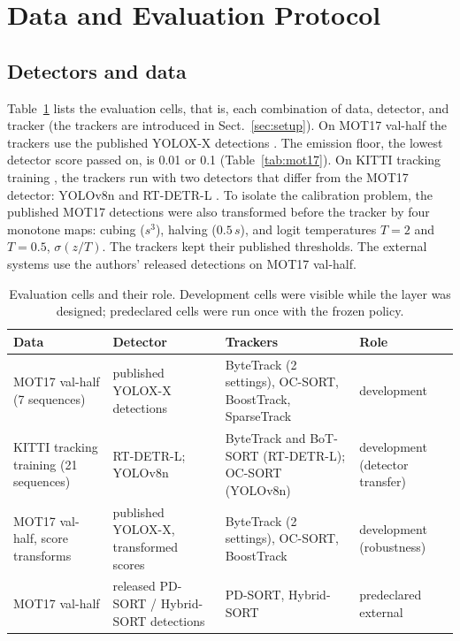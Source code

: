 \documentclass[pdflatex,sn-mathphys-num,iicol]{sn-jnl}
\begin{document}
\section{Data and Evaluation Protocol}\label{sec:data-eval}

\subsection{Detectors and data}\label{sec:data}
Table~\ref{tab:data} lists the evaluation cells, that is, each combination of
data, detector, and tracker (the trackers are introduced in Sect.~\ref{sec:setup}). On MOT17 val-half
\cite{milan2016mot16} the trackers use the published YOLOX-X detections
\cite{ge2021yolox}. The emission floor, the lowest detector score passed on,
is 0.01 or 0.1 (Table~\ref{tab:mot17}). On KITTI tracking training \cite{geiger2012kitti}, the trackers run
with two detectors that differ from the MOT17 detector: YOLOv8n
\cite{jocher2023yolov8} and RT-DETR-L \cite{zhao2024rtdetr}. To isolate the
calibration problem, the published MOT17 detections were also transformed
before the tracker by four monotone maps: cubing ($s^3$), halving ($0.5\,s$),
and logit temperatures $T=2$ and $T=0.5$, $\sigma(z/T)$. The trackers kept
their published thresholds. The external systems use the authors' released
detections on MOT17 val-half.

\begin{table}[t]
\caption{Evaluation cells and their role. Development cells were visible while
the layer was designed; predeclared cells were run once with the frozen
policy.}
\label{tab:data}
\centering\footnotesize
\setlength{\tabcolsep}{4pt}
\begin{tabular}{@{}>{\raggedright\arraybackslash}p{36mm}>{\raggedright\arraybackslash}p{32mm}>{\raggedright\arraybackslash}p{50mm}>{\raggedright\arraybackslash}p{30mm}@{}}
\toprule
Data & Detector & Trackers & Role\\
\midrule
MOT17 val-half (7 sequences) & published YOLOX-X detections & ByteTrack (2 settings), OC-SORT, BoostTrack, SparseTrack & development\\
KITTI tracking training (21 sequences) & RT-DETR-L; YOLOv8n & ByteTrack and BoT-SORT (RT-DETR-L); OC-SORT (YOLOv8n) & development (detector transfer)\\
MOT17 val-half, score transforms & published YOLOX-X, transformed scores & ByteTrack (2 settings), OC-SORT, BoostTrack & development (robustness)\\
MOT17 val-half & released PD-SORT / Hybrid-SORT detections & PD-SORT, Hybrid-SORT & predeclared external\\
\bottomrule
\end{tabular}
\end{table}
\end{document}
